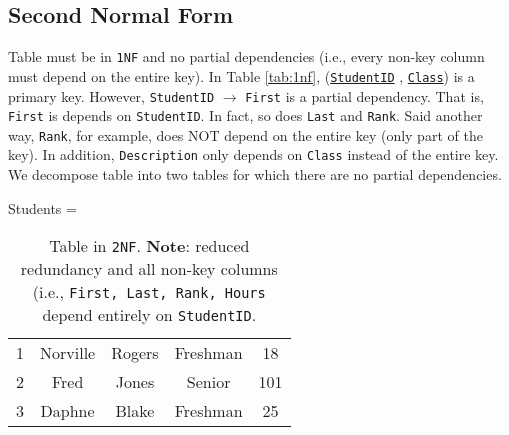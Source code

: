 \documentclass{article}
\begin{document}
 
 
 
 
 
 
 
 
 \subsection*{Second Normal Form}
 
 Table must be in \texttt{1NF} and no partial dependencies (i.e., every non-key column must depend on the entire key).  In Table \ref{tab:1nf}, (\underline{\texttt{StudentID}} , \underline{\texttt{Class}}) is a primary key.  However, \texttt{StudentID} $\to $ \texttt{First} is a partial dependency.  That is, \texttt{First} is depends on \texttt{StudentID}.  In fact, so does \texttt{Last} and \texttt{Rank}.  Said another way, \texttt{Rank}, for example, does NOT depend on the entire key (only part of the key).  In addition, \texttt{Description} only depends on \texttt{Class} instead of the entire key.  We decompose table into two tables for which there are no partial dependencies.  


  
 
 

\begin{table}[h!]
\caption{Table in \texttt{2NF}.  \textbf{Note}: reduced redundancy and all non-key columns (i.e., \texttt{First, Last, Rank, Hours} depend entirely on \texttt{StudentID}.    }
\begin{center}

Students = \begin{tabular}{|c|c|c|c|c|}
   \hline
  \cellcolor{excel}{StudentID}  & \cellcolor{excel}{First} & \cellcolor{excel}{Last}
&  \cellcolor{excel}{Rank} &  \cellcolor{excel}{Hours}  \\
  \hline
  
  1 & Norville & Rogers &   Freshman & 18 \\
      \hline

  2 & Fred & Jones  &  Senior & 101 \\ 
  \hline
 
   3 & Daphne & Blake &  Freshman & 25 \\
      \hline 
      
\end{tabular}
\end{center}
\label{tab:2nf1}
\end{table}%
% 
% 
% 
 
\end{document}
